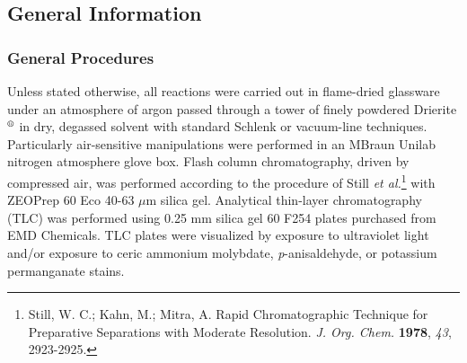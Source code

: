 


\subsection{General Information}

\subsubsection{General Procedures}
Unless stated otherwise, all reactions were carried out in flame-dried glassware under an atmosphere
of argon passed through a tower of finely powdered Drierite$\textsuperscript{\textregistered}$ in dry, degassed solvent with standard
Schlenk or vacuum-line techniques. Particularly air-sensitive manipulations were performed in an
MBraun Unilab nitrogen atmosphere glove box. Flash column chromatography, driven by compressed air,
was performed according to the procedure of Still \textit{et al.}\footnote{{\frenchspacing Still, W. C.; Kahn, M.; Mitra,
A. Rapid Chromatographic Technique for Preparative Separations with Moderate Resolution. \textit{J.
Org. Chem.} \textbf{1978}, \textit{43}, 2923-2925.}} with
ZEOPrep 60 Eco 40-63 $\mu$m silica gel. Analytical thin-layer chromatography (TLC) was performed using 0.25 mm
silica gel 60 F254 plates purchased from EMD Chemicals. TLC plates were visualized by exposure to ultraviolet light and/or exposure to ceric
ammonium molybdate, \textit{p}-anisaldehyde, or potassium permanganate stains. 

